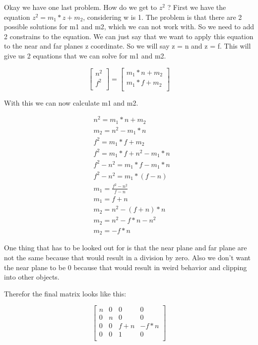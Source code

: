 \documentclass[12pt]{report} \usepackage{preamble}
\begin{document}
Okay we have one last problem. How do we get to \(z^2\) ?
First we have the equation \(z^2 = m_1 * z + m_2\), considering w is 1.
The problem is that there are 2 possible solutions for m1 and m2, which we
can not work with. So we need to add 2 constrains to the equation.
We can just say that we want to apply this equation to the near and far planes z coordinate.
So we will say z = n and z = f. This will give us 2 equations that we can solve for m1 and m2.

\[
	\begin{bmatrix}
		n^2 \\
		f^2 \\
	\end{bmatrix}
	=
	\begin{bmatrix}
		m_1 * n + m_2 \\
		m_1 * f + m_2 \\
	\end{bmatrix}
\]

With this we can now calculate m1 and m2.

\[
	\begin{aligned}
		 & n^2 = m_1 * n + m_2           \\
		 & m_2 = n^2 - m_1 * n           \\
		 & f^2 = m_1 * f + m_2           \\
		 & f^2 = m_1 * f + n^2 - m_1 * n \\
		 & f^2 - n^2 = m_1 * f - m_1 * n \\
		 & f^2 - n^2 = m_1 * (f - n)     \\
		 & m_1 = \frac{f^2 - n^2}{f - n} \\
		 & m_1 = f + n                   \\
		 & m_2 = n^2 - (f + n) * n       \\
		 & m_2 = n^2 - f * n - n^2       \\
		 & m_2 = -f * n
	\end{aligned}
\]

One thing that has to be looked out for is that the near plane and far plane
are not the same because that would result in a division by zero. Also we don't
want the near plane to be 0 because that would result in weird behavior and clipping
into other objects.

Therefor the final matrix looks like this:

\[
	\begin{bmatrix}
		n & 0 & 0     & 0      \\
		0 & n & 0     & 0      \\
		0 & 0 & f + n & -f * n \\
		0 & 0 & 1     & 0      \\
	\end{bmatrix}
\]
\end{document}

